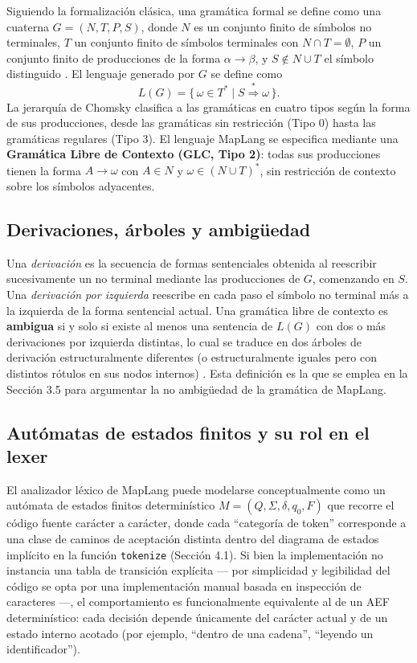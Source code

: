 \documentclass[10pt,twocolumn]{article}
\begin{document}
Siguiendo la formalización clásica, una gramática formal se define como
una cuaterna $G = (N, T, P, S)$, donde $N$ es un conjunto finito de
símbolos no terminales, $T$ un conjunto finito de símbolos terminales con
$N \cap T = \emptyset$, $P$ un conjunto finito de producciones de la forma
$\alpha \rightarrow \beta$, y $S \notin N \cup T$ el símbolo distinguido
\cite{teoria_computacion_cattedra}. El lenguaje generado por $G$ se define
como
\[
L(G) = \{\, \omega \in T^{*} \mid S \overset{*}{\Rightarrow} \omega \,\}.
\]
La jerarquía de Chomsky clasifica a las gramáticas en cuatro tipos según
la forma de sus producciones, desde las gramáticas sin restricción (Tipo
0) hasta las gramáticas regulares (Tipo 3). El lenguaje MapLang se
especifica mediante una \textbf{Gramática Libre de Contexto (GLC, Tipo
2)}: todas sus producciones tienen la forma $A \rightarrow \omega$ con
$A \in N$ y $\omega \in (N \cup T)^{*}$, sin restricción de contexto sobre
los símbolos adyacentes.

\subsection{Derivaciones, árboles y ambigüedad}

Una \textit{derivación} es la secuencia de formas sentenciales obtenida al
reescribir sucesivamente un no terminal mediante las producciones de $G$,
comenzando en $S$. Una \textit{derivación por izquierda} reescribe en cada
paso el símbolo no terminal más a la izquierda de la forma sentencial
actual. Una gramática libre de contexto es \textbf{ambigua} si y solo si
existe al menos una sentencia de $L(G)$ con dos o más derivaciones por
izquierda distintas, lo cual se traduce en dos árboles de derivación
estructuralmente diferentes (o estructuralmente iguales pero con distintos
rótulos en sus nodos internos) \cite{teoria_computacion_cattedra}. Esta
definición es la que se emplea en la Sección 3.5 para argumentar la no
ambigüedad de la gramática de MapLang.

\subsection{Autómatas de estados finitos y su rol en el lexer}

El analizador léxico de MapLang puede modelarse conceptualmente como un
autómata de estados finitos determinístico
$M = (Q, \Sigma, \delta, q_0, F)$ que recorre el código fuente carácter a
carácter, donde cada ``categoría de token'' corresponde a una clase de
caminos de aceptación distinta dentro del diagrama de estados implícito en
la función \texttt{tokenize} (Sección 4.1). Si bien la implementación no
instancia una tabla de transición explícita --- por simplicidad y
legibilidad del código se opta por una implementación manual basada en
inspección de caracteres ---, el comportamiento es funcionalmente
equivalente al de un AEF determinístico: cada decisión depende únicamente
del carácter actual y de un estado interno acotado (por ejemplo, ``dentro de
una cadena'', ``leyendo un identificador'').
\end{document}
